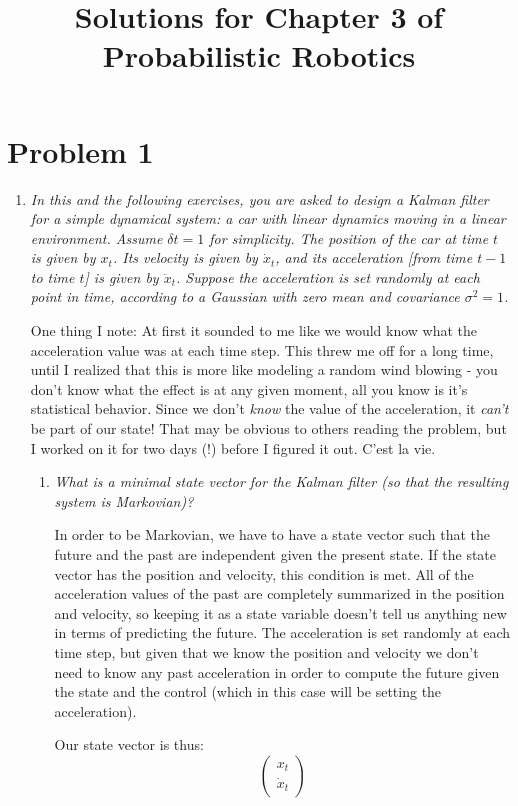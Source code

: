 \documentclass[10pt]{article}
\begin{document}
\title{Solutions for Chapter 3 of Probabilistic Robotics}

\section{Problem 1}
\begin{enumerate}
  \item \textit{In this and the following exercises, you are asked to design a Kalman
filter for a simple dynamical system: a car with linear dynamics moving in a
linear environment. Assume $\delta t = 1$ for simplicity. The position of the
car at time $t$ is given by $x_t$. Its velocity is given by $\dot{x}_t$, and its
acceleration [from time $t-1$ to time $t$] is given by $\ddot{x}_t$. Suppose the
acceleration is set randomly at each point in time, according to a Gaussian with
zero mean and covariance $\sigma^2 = 1$.}

One thing I note: At first it sounded to me like we would know what the
acceleration value was at each time step. This threw me off for a long time,
until I realized that this is more like modeling a random wind blowing - you
don't know what the effect is at any given moment, all you know is it's
statistical behavior. Since we don't \textit{know} the value of the
acceleration, it \textit{can't} be part of our state! That may be obvious to
others reading the problem, but I worked on it for two days (!) before I figured
it out. C'est la vie.

  \begin{enumerate}
    \item \textit{What is a minimal state vector for the Kalman filter (so that
      the resulting system is Markovian)?} 

      In order to be Markovian, we have to have a state vector such that the
      future and the past are independent given the present state. If the state
      vector has the position and velocity, this condition is met. All of the
      acceleration values of the past are completely summarized in the position
      and velocity, so keeping it as a state variable doesn't tell us anything
      new in terms of predicting the future. The acceleration is set randomly at
      each time step, but given that we know the position and velocity we don't
      need to know any past acceleration in order to compute the future given
      the state and the control (which in this case will be setting the
      acceleration).

      Our state vector is thus:
    $$\begin{pmatrix}x_t \\ \dot{x}_t\end{pmatrix}$$


\end{enumerate}
\end{enumerate}
\end{document}
